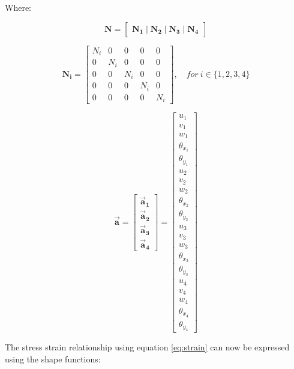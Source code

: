 Where:

\[
\mathbf{N} = \begin{bmatrix} \mathbf{N_1} \mid \mathbf{N_2} \mid \mathbf{N_3} \mid \mathbf{N_4} \end{bmatrix}
\]

\[
\mathbf{N_i} =  
  \begin{bmatrix}
      N_i & 0 & 0 & 0 & 0  \\
      0 & N_i & 0 & 0 & 0  \\
      0 & 0 & N_i & 0 & 0  \\
      0 & 0 & 0 & N_i & 0  \\
      0 & 0 & 0 & 0 & N_i 
  \end{bmatrix}, \quad for \ i \in \{1,2,3,4\}
\]



\[\vec{\mathbf{a}}=\begin{bmatrix}
{\vec{\mathbf{a}}}_{\mathbf{1}} \\
{\vec{\mathbf{a}}}_{\mathbf{2}} \\
{\vec{\mathbf{a}}}_{\mathbf{3}} \\
{\vec{\mathbf{a}}}_{\mathbf{4}}
\end{bmatrix}=\begin{bmatrix}
u_{1} \\
v_{1} \\
w_{1} \\
\theta_{x_{1}} \\
\theta_{y_{1}} \\
u_{2} \\
v_{2} \\
w_{2} \\
\theta_{x_{2}} \\
\theta_{y_{2}} \\
u_{3} \\
v_{3} \\
w_{3} \\
\theta_{x_{3}} \\
\theta_{y_{3}} \\
u_{4} \\
v_{4} \\
w_{4} \\
\theta_{x_{4}} \\
\theta_{y_{4}}
\end{bmatrix}\]

The stress strain relationship using equation \eqref{eq:strain} can now be
expressed using the shape functions:


